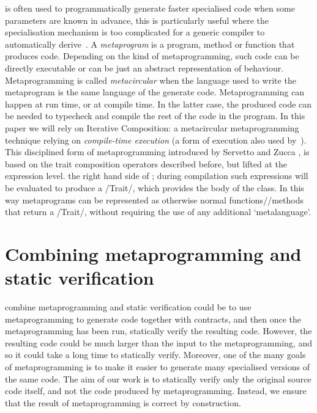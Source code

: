  is often used to programmatically generate faster specialised code when some parameters are known in advance, this is particularly useful where the specialisation mechanism is too complicated for a generic compiler to automatically derive~\cite{Ofenbeck:2017:SGP:3136040.3136060}.
A \emph{metaprogram} is a program, method or function 
that produces code. Depending on the kind of metaprogramming, such code can be directly executable or can be just an abstract representation of behaviour.
Metaprogramming is called \emph{metacircular} when the language used to write the metaprogram is the same language of the generate code.
Metaprogramming can happen at run time, or at compile time. In the latter case, the produced code can be needed to typecheck and compile the rest of the code in the program.
In this paper we will rely on 
Iterative Composition: 
a metacircular metaprogramming technique relying on \emph{compile-time execution} (a form of execution also used by~\cite{sheard2002template}).
This disciplined form of metaprogramming introduced by Servetto and Zucca \cite{servetto2014meta}, is based on the trait composition operators described before, but lifted at the expression level.
 the right hand side of ; during compilation such expressions will be evaluated to produce a /Trait/, which provides the body of the class. In this way metaprograms can be represented as otherwise normal functions//methods that return a /Trait/, without requiring the use of any additional `metalanguage'.

\section{Combining metaprogramming and static verification}

 combine metaprogramming and static verification could be to use metaprogramming to generate code together with contracts, and then once the metaprogramming has been run,
statically verify the resulting code. 
However, the resulting code could be much larger than the input to the metaprogramming, and so it could take a long time to statically verify.
Moreover, one of the many goals of metaprogramming is to make it easier to generate many specialised versions of the same  code.
The aim of our work is to statically verify only the original source code itself, and not the code produced by metaprogramming.
Instead, we
ensure that the result of metaprogramming is correct by construction.

